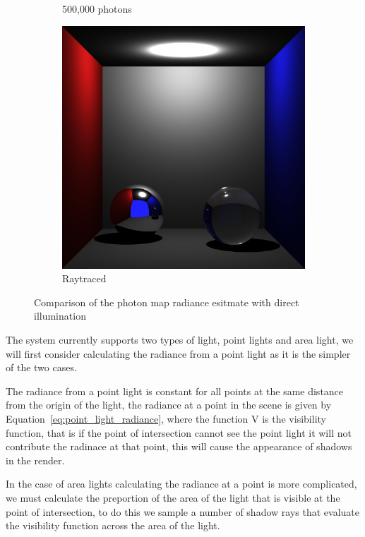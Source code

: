 \begin{figure}[h]
\begin{subfigure}[c]{0.3\textwidth}
	\caption{500,000 photons}
	\end{subfigure}
	\begin{subfigure}[c]{0.3\textwidth}
	\includegraphics[width=\textwidth]{./images/renders/direct_photon_comp/direct.png}
	\caption{Raytraced}
	\end{subfigure}
	\caption{Comparison of the photon map radiance esitmate with direct illumination}
\label{fig:direct_compare}
\end{figure}

The system currently supports two types of light, point lights and area light, we will first consider calculating the radiance
from a point light as it is the simpler of the two cases.

The radiance from a point light is constant for all points at the same distance from the origin of the light, the radiance at
a point in the scene is given by Equation~\eqref{eq:point_light_radiance}, where the function V is the visibility function, that
is if the point of intersection cannot see the point light it will not contribute the radinace at that point, this will cause
the appearance of shadows in the render.

In the case of area lights calculating the radiance at a point is more complicated, we must calculate the preportion of the
area of the light that is visible at the point of intersection, to do this we sample a number of shadow rays that evaluate the
visibility function across the area of the light.

